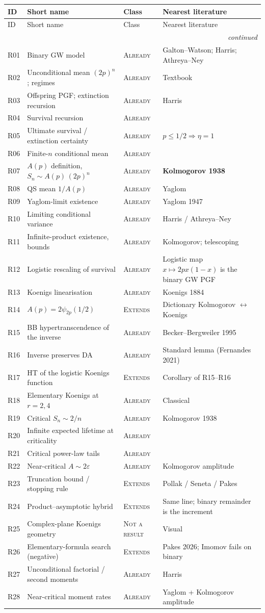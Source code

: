 \documentclass[11pt,a4paper]{report}
\newcommand{\cls}[1]{\textsc{#1}}
\newcommand{\ext}{\cls{Extends}}
\newcommand{\alr}{\cls{Already}}
\newcommand{\nar}{\cls{Not a result}}
\newcommand{\itemhead}{%
  \toprule
  ID & Short name & Class & Nearest literature \\
  \midrule
  \endfirsthead
  \toprule
  ID & Short name & Class & Nearest literature \\
  \midrule
  \endhead
  \midrule
  \multicolumn{4}{r}{\footnotesize\itshape continued} \\
  \endfoot
  \bottomrule
  \endlastfoot
}
\newcommand{\itemtable}{\begin{longtable}{L{1.55cm}L{4.35cm}L{2.35cm}L{6.55cm}}}
\begin{document}
\itemtable
\itemhead
R01 & Binary GW model & \alr & Galton--Watson; Harris; Athreya--Ney \\
R02 & Unconditional mean \((2p)^n\); regimes & \alr & Textbook \\
R03 & Offspring PGF; extinction recursion & \alr & Harris \\
R04 & Survival recursion & \alr & \\
R05 & Ultimate survival / extinction certainty & \alr &
\(p\le 1/2\Rightarrow\eta=1\) \\
R06 & Finite-\(n\) conditional mean & \alr & \\
R07 & \(A(p)\) definition, \(S_n\sim A(p)\,(2p)^n\) & \alr &
\textbf{Kolmogorov 1938} \\
R08 & QS mean \(1/A(p)\) & \alr & Yaglom \\
R09 & Yaglom-limit existence & \alr & Yaglom 1947 \\
R10 & Limiting conditional variance & \alr & Harris / Athreya--Ney \\
R11 & Infinite-product existence, bounds & \alr & Kolmogorov; telescoping \\
R12 & Logistic rescaling of survival & \alr &
Logistic map \(x\mapsto 2px(1-x)\) is the binary GW PGF \\
R13 & Koenigs linearisation & \alr & Koenigs 1884 \\
R14 & \(A(p)=2\psi_{2p}(1/2)\) & \ext &
Dictionary Kolmogorov \(\leftrightarrow\) Koenigs \\
R15 & BB hypertranscendence of the inverse & \alr &
Becker--Bergweiler 1995 \\
R16 & Inverse preserves DA & \alr & Standard lemma (Fernandes 2021) \\
R17 & HT of the logistic Koenigs function & \ext & Corollary of R15--R16 \\
R18 & Elementary Koenigs at \(r=2,4\) & \alr & Classical \\
R19 & Critical \(S_n\sim 2/n\) & \alr & Kolmogorov 1938 \\
R20 & Infinite expected lifetime at criticality & \alr & \\
R21 & Critical power-law tails & \alr & \\
R22 & Near-critical \(A\sim 2\varepsilon\) & \alr & Kolmogorov amplitude \\
R23 & Truncation bound / stopping rule & \ext & Pollak / Seneta / Pakes \\
R24 & Product--asymptotic hybrid & \ext &
Same line; binary remainder is the increment \\
R25 & Complex-plane Koenigs geometry & \nar & Visual \\
R26 & Elementary-formula search (negative) & \ext &
Pakes 2026; Imomov fails on binary \\
R27 & Unconditional factorial / second moments & \alr & Harris \\
R28 & Near-critical moment rates & \alr & Yaglom + Kolmogorov amplitude \\
\end{longtable}
\end{document}
